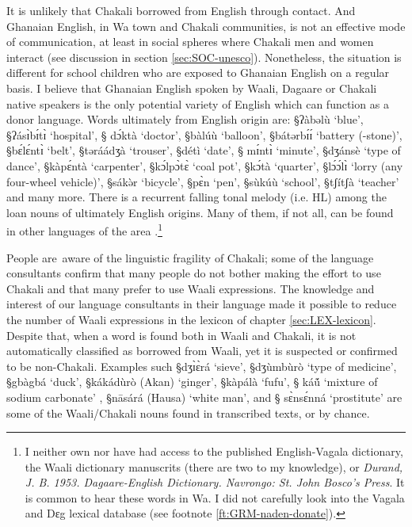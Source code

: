 It is unlikely that Chakali borrowed from English through contact. And Ghanaian
English, in Wa town and Chakali communities,  is not an effective mode of
communication, at least in social spheres where Chakali men and women 
interact (see discussion in section \ref{sec:SOC-unesco}).  Nonetheless, the
situation is different for school children  who are
exposed to Ghanaian English on a regular basis. I believe that Ghanaian English
spoken by Waali, Dagaare or Chakali native speakers is the only potential
variety of English which can function as a donor language. Words ultimately  
from
English origin are: {\S ʔàbəlù} `blue', {\S ʔásɪ̀bɪ́tɪ̀} `hospital',    {\S
dɔ́ktà} `doctor', {\S bàlúù} `balloon', {\S bátərbɪ́ɪ́} `battery (-stone)',
{\S bɛ́lɛ́ntɪ̀} `belt',  {\S təráádʒà} `trouser',  {\S détì} `date',    {\S
mɪ́ntɪ̀} `minute',   {\S dʒánsè} `type of dance',  {\S kàpɛ́ntà}
`carpenter', {\S kɔ́lpɔ̀tɛ̀} `coal pot', {\S kɔ́tà} `quarter',  {\S lɔ́ɔ́lɪ̀}
`lorry (any four-wheel vehicle)',   {\S sákə̀r} `bicycle',  {\S pɛ̀n} `pen',
{\S sùkúù} `school',   {\S tʃítʃà} `teacher' and many more.  There is 
a recurrent falling tonal melody (i.e. HL) among the loan nouns of  ultimately
English origins. Many of them,  if not all, can be found in other
languages of the area \citep{Sisa75, Daku07}.\footnote{I neither own nor have 
had access to the published English-Vagala dictionary, the  
Waali dictionary manuscrits (there are two to my knowledge), or {\it Durand, J.
B. 1953. Dagaare-English Dictionary. Navrongo: St. John Bosco's Press}. It is
common to hear these words in Wa. I did not carefully look into the Vagala and
Dɛg lexical database (see footnote \ref{ft:GRM-naden-donate}).}

People are aware of the linguistic fragility of Chakali; some of the
language
consultants confirm that many people do not bother making  the effort to use
Chakali and that many
prefer to use Waali expressions.  The knowledge and interest of our
language consultants in their language made  it possible  to reduce the number
of
Waali
expressions in the  lexicon of chapter \ref{sec:LEX-lexicon}.  Despite that,
when a word is found both in
Waali and Chakali, it is not automatically classified as borrowed from Waali,
yet it is suspected or confirmed to be non-Chakali.  Examples such
{\S dʒɪ̀ɛ̀rá} `sieve', {\S dʒùmbùrò} `type of medicine', {\S gbàgbá}
`duck', {\S kákádùrò} (Akan)  `ginger', {\S kàpálà} `fufu', {\S
káṹ}  `mixture
of sodium carbonate' , {\S nāsárá}  (Hausa) `white man', and  {\S
sɛ̀nsɛ́nná}
`prostitute' are some of the Waali/Chakali nouns  found in transcribed texts, or
by chance. 

